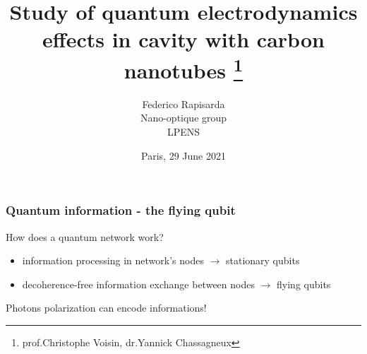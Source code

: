 \documentclass[xcolor = {dvipsnames}]{beamer}
\title[QED of CNTs in cavity]{Study of quantum electrodynamics effects in cavity with carbon nanotubes \thanks{prof.Christophe Voisin, dr.Yannick Chassagneux}}
\author[Federico Rapisarda - LPENS]{Federico Rapisarda\\
Nano-optique group\\
LPENS}
\institute{
	Politecnico di Torino
	\and
	Universit\'{e} de Paris
}
\date[29 June 2021]{Paris, 29 June 2021}
\begin{document}
\frame{\titlepage}

\begin{frame}
\frametitle{Quantum information - the flying qubit}

How does a quantum network work?
\pause
\begin{itemize}
\item <2-> information processing in network's nodes $\rightarrow$ stationary qubits
\item <3-> decoherence-free information exchange between nodes $\rightarrow$ \alert{flying} qubits
\end{itemize}
\pause
Photons polarization can encode informations!\\
\end{frame}

\end{document}
